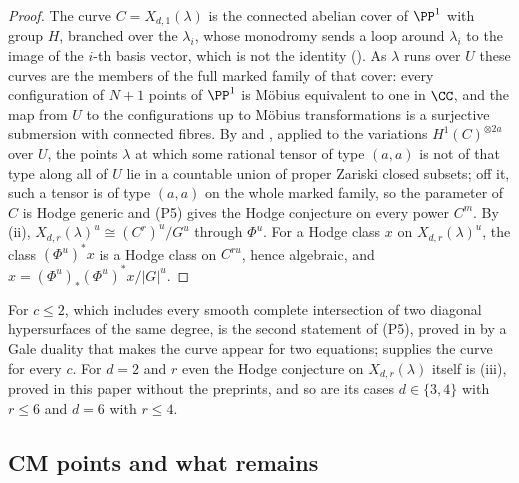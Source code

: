\begin{proof}
The curve $C=X_{d,1}(\lambda)$ is the connected abelian cover of $\PP^{1}$
with group $H$, branched over the $\lambda_{i}$, whose monodromy sends a loop
around $\lambda_{i}$ to the image of the $i$-th basis vector, which is not
the identity (). As $\lambda$ runs over $U$ these
curves are the members of the full marked family of that cover: every
configuration of $N+1$ points of $\PP^{1}$ is M\"obius equivalent to one in
$\CC$, and the map from $U$ to the configurations up to M\"obius
transformations is a surjective submersion with connected fibres. By
 and , applied to the variations
$H^{1}(C)^{\otimes2a}$ over $U$, the points $\lambda$ at which some rational
tensor of type $(a,a)$ is not of that type along all of $U$ lie in a
countable union of proper Zariski closed subsets; off it, such a tensor is
of type $(a,a)$ on the whole marked family, so the parameter of $C$ is
Hodge generic and (P5) gives the Hodge conjecture on every power $C^{m}$. By
(ii), $X_{d,r}(\lambda)^{u}\cong(C^{r})^{u}/G^{u}$
through $\Phi^{u}$. For a Hodge class $x$ on $X_{d,r}(\lambda)^{u}$, the class
$(\Phi^{u})^{*}x$ is a Hodge class on $C^{ru}$, hence algebraic, and
$x=(\Phi^{u})_{*}(\Phi^{u})^{*}x/|G|^{u}$.
\end{proof}

For $c\le2$, which includes every smooth complete intersection of two
diagonal hypersurfaces of the same degree,  is the
second statement of (P5), proved in \cite{OAI26a} by a Gale duality that
makes the curve appear for two equations;  supplies
the curve for every $c$. For $d=2$ and $r$ even the Hodge conjecture
on $X_{d,r}(\lambda)$ itself is (iii), proved in
this paper without the preprints, and so are its cases $d\in\{3,4\}$ with
$r\le6$ and $d=6$ with $r\le4$.

\subsection{CM points and what remains}\label{ssec:remains}

